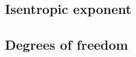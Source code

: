 \documentclass[../main.tex]{subfiles}
\begin{document}
\subsection{Isentropic exponent}

\subsection{Degrees of freedom}
   
\end{document}
